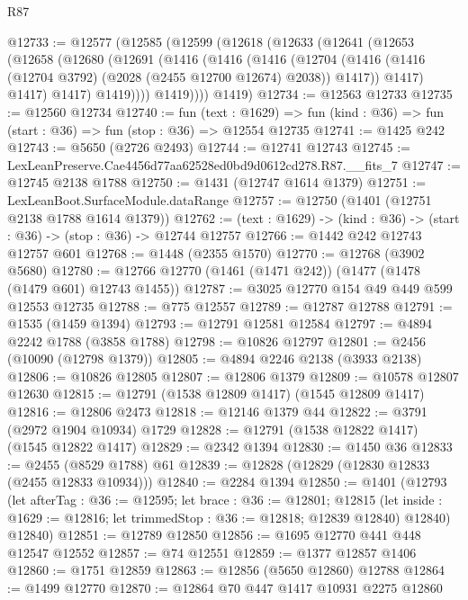 \begin{lexlean}{R87}
\begin{coremodule}
{{@12733 := @12577
    (@12585
      (@12599
        (@12618
          (@12633
            (@12641
              (@12653
                (@12658
                  (@12680
                    (@12691
                      (@1416
                        (@1416
                          (@1416
                            (@12704
                              (@1416
                                (@1416 (@12704 @3792) (@2028 (@2455 @12700 @12674) @2038))
                                @1417))
                            @1417)
                          @1417)
                        @1417)
                      @1419))))
              @1419))))
      @1419)
@12734 := @12563 @12733
@12735 := @12560 @12734
@12740 := fun (text : @1629) =>
  fun (kind : @36) => fun (start : @36) => fun (stop : @36) => @12554 @12735
@12741 := @1425 @242
@12743 := @5650 (@2726 @2493)
@12744 := @12741 @12743
@12745 := LexLeanPreserve.Cae4456d77aa62528ed0bd9d0612cd278.R87.__fits_7
@12747 := @12745 @2138 @1788
@12750 := @1431 (@12747 @1614 @1379)
@12751 := LexLeanBoot.SurfaceModule.dataRange
@12757 := @12750 (@1401 (@12751 @2138 @1788 @1614 @1379))
@12762 := (text : @1629) -> (kind : @36) -> (start : @36) -> (stop : @36) -> @12744 @12757
@12766 := @1442 @242 @12743 @12757 @601
@12768 := @1448 (@2355 @1570)
@12770 := @12768 (@3902 @5680)
@12780 := @12766 @12770 (@1461 (@1471 @242)) (@1477 (@1478 (@1479 @601) @12743 @1455))
@12787 := @3025 @12770 @154 @49 @449 @599 @12553 @12735
@12788 := @775 @12557
@12789 := @12787 @12788
@12791 := @1535 (@1459 @1394)
@12793 := @12791 @12581 @12584
@12797 := @4894 @2242 @1788 (@3858 @1788)
@12798 := @10826 @12797
@12801 := @2456 (@10090 (@12798 @1379))
@12805 := @4894 @2246 @2138 (@3933 @2138)
@12806 := @10826 @12805
@12807 := @12806 @1379
@12809 := @10578 @12807 @12630
@12815 := @12791 (@1538 @12809 @1417) (@1545 @12809 @1417)
@12816 := @12806 @2473
@12818 := @12146 @1379 @44
@12822 := @3791 (@2972 @1904 @10934) @1729
@12828 := @12791 (@1538 @12822 @1417) (@1545 @12822 @1417)
@12829 := @2342 @1394
@12830 := @1450 @36
@12833 := @2455 (@8529 @1788) @61
@12839 := @12828 (@12829 (@12830 @12833 (@2455 @12833 @10934)))
@12840 := @2284 @1394
@12850 := @1401
    (@12793
      (let afterTag : @36 := @12595;
      let brace : @36 := @12801;
      @12815 (let inside : @1629 := @12816; let trimmedStop : @36 := @12818; @12839 @12840) @12840)
      @12840)
@12851 := @12789 @12850
@12856 := @1695 @12770 @441 @448 @12547 @12552
@12857 := @74 @12551
@12859 := @1377 @12857 @1406
@12860 := @1751 @12859
@12863 := @12856 (@5650 @12860) @12788
@12864 := @1499 @12770
@12870 := @12864 @70 @447 @1417 @10931 @2275 @12860
}}
\end{coremodule}
\end{lexlean}

